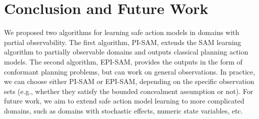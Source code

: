 \documentclass{article}
\theoremstyle{plain}
\theoremstyle{definition}
\theoremstyle{remark}
\theoremstyle{observation}
\newcommand{\pre}{\textit{pre}}
\newcommand{\eff}{\textit{eff}}
\begin{document}

                                

\section{Conclusion and Future Work}
We proposed two algorithms for learning safe action models in domains with partial observability. The first algorithm, PI-SAM, extends the SAM learning algorithm \citep{juba2021safe} to partially observable domains and outputs classical planning action models. The second algorithm, EPI-SAM, provides the outputs in the form of conformant planning problems, but can work on general observations. In practice,  we can choose either PI-SAM or EPI-SAM, depending on the specific observation sets (e.g., whether they satisfy the bounded concealment assumption or not). For future work, we aim to extend safe action model learning to more complicated domains, such as domains with stochastic effects, numeric state variables, etc. 
\end{document}
